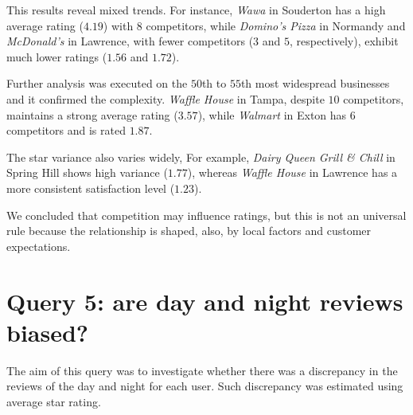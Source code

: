 \documentclass{Configuration_Files/PoliMi3i_thesis}
\begin{document}
\bigskip

This results reveal mixed trends. For instance, \textit{Wawa} in Souderton has a high average rating ($4.19$) with $8$ competitors, while \textit{Domino's Pizza} in Normandy and \textit{McDonald's} in Lawrence, with fewer competitors ($3$ and $5$, respectively), exhibit much lower ratings ($1.56$ and $1.72$). 

Further analysis was executed on the $50$th to $55$th most widespread businesses and it confirmed the complexity. \textit{Waffle House} in Tampa, despite $10$ competitors, maintains a strong average rating ($3.57$), while \textit{Walmart} in Exton has $6$ competitors and is rated $1.87$. 

The star variance also varies widely, For example, \textit{Dairy Queen Grill \& Chill} in Spring Hill shows high variance ($1.77$), whereas \textit{Waffle House} in Lawrence has a more consistent satisfaction level ($1.23$).

We concluded that competition may influence ratings, but this is not an universal rule because the relationship is shaped, also, by local factors and customer expectations.

\section{Query 5: are day and night reviews biased?}
The aim of this query was to investigate whether there was a discrepancy in the reviews of the day and night for each user. Such discrepancy was estimated using average star rating.

\bigskip
\end{document}
